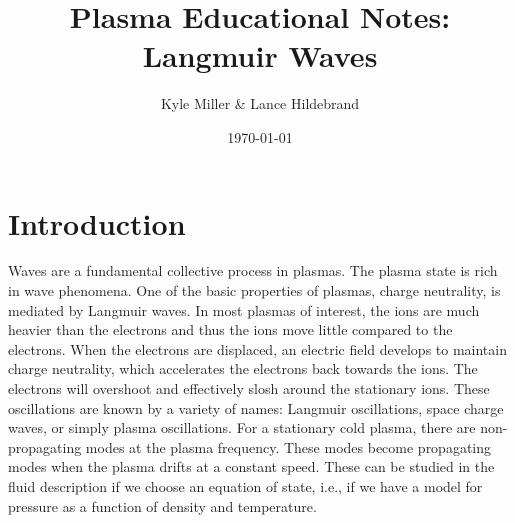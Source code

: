 \documentclass[12pt]{article}
\begin{document}
	
\title{\vspace{-5ex}Plasma Educational Notes: Langmuir Waves\vspace{-1ex}}
\date{\vspace{-1ex}\today}
\author{Kyle Miller \& Lance Hildebrand}
\maketitle

\section*{Introduction}
Waves are a fundamental collective process in plasmas. The plasma state is rich in wave phenomena. One of the basic properties of plasmas, charge neutrality, is mediated by Langmuir waves. In most plasmas of interest, the ions are much heavier than the electrons and thus the ions move little compared to the electrons. When the electrons are displaced, an electric field develops to maintain charge neutrality, which accelerates the electrons back towards the ions. The electrons will overshoot and effectively slosh around the stationary ions. These oscillations are known by a variety of names: Langmuir oscillations, space charge waves, or simply plasma oscillations. For a stationary cold plasma, there are non-propagating modes at the plasma frequency. These modes become propagating modes when the plasma drifts at a constant speed. These can be studied in the fluid description if we choose an equation of state, i.e., if we have a model for pressure as a function of density and temperature.
\end{document}
